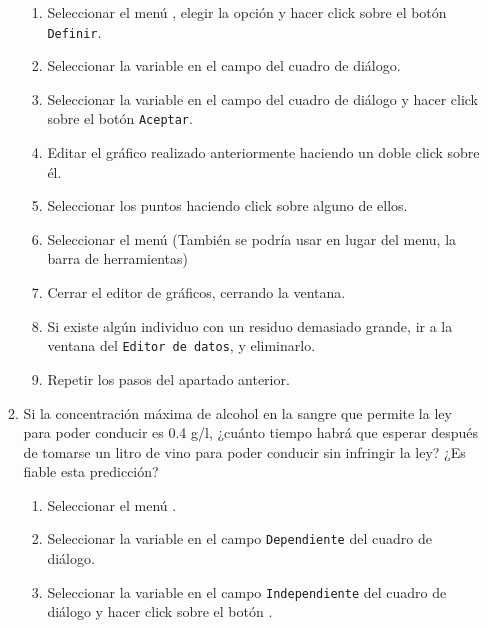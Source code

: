 \begin{enumerate}[leftmargin=*]
\begin{enumerate}
\begin{indicacion}{
\begin{enumerate}
\item Seleccionar el menú , elegir
la opción  y  hacer click sobre el botón
\texttt{Definir}. \item Seleccionar la variable 
en el campo  del cuadro de diálogo. \item
Seleccionar la variable  en el campo 
del cuadro de diálogo y hacer click sobre el botón
\texttt{Aceptar}.

\item Editar el gráfico realizado anteriormente haciendo un doble
click sobre él.

\item Seleccionar los puntos haciendo click sobre alguno de ellos.
\item Seleccionar el menú  (También se podría usar en lugar
del menu, la barra de herramientas) \item Cerrar el editor de
gráficos, cerrando la ventana.

\item Si existe algún individuo con un residuo demasiado grande,
ir a la ventana del \texttt{Editor de datos}, y eliminarlo.

\item Repetir los pasos del apartado anterior.
\end{enumerate}}
\end{indicacion}


\item  Si la concentración máxima de alcohol en la sangre que
permite la ley para poder conducir es 0.4 g/l, ¿cuánto tiempo
habrá que esperar después de tomarse un litro de vino para poder
conducir sin infringir la ley? ¿Es fiable esta predicción?

\begin{indicacion}{
\begin{enumerate}
\item Seleccionar el menú .

\item Seleccionar la variable  en el campo
\texttt{Dependiente} del cuadro de diálogo.

\item Seleccionar la variable  en el campo
\texttt{Independiente} del cuadro de diálogo y hacer click sobre
el botón .


\end{enumerate}}
\end{indicacion}
\end{enumerate}
\end{enumerate}
